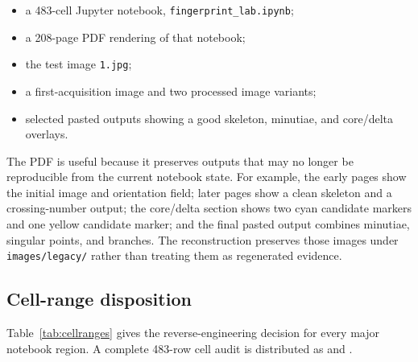 \documentclass[11pt]{article}
\begin{document}
\begin{itemize}
  \item a 483-cell Jupyter notebook, \texttt{fingerprint\_lab.ipynb};
  \item a 208-page PDF rendering of that notebook;
  \item the test image \texttt{1.jpg};
  \item a first-acquisition image and two processed image variants;
  \item selected pasted outputs showing a good skeleton, minutiae, and core/delta overlays.
\end{itemize}

The PDF is useful because it preserves outputs that may no longer be reproducible from the current notebook state. For example, the early pages show the initial image and orientation field; later pages show a clean skeleton and a crossing-number output; the core/delta section shows two cyan candidate markers and one yellow candidate marker; and the final pasted output combines minutiae, singular points, and branches. The reconstruction preserves those images under \texttt{images/legacy/} rather than treating them as regenerated evidence.

\subsection{Cell-range disposition}

Table~\ref{tab:cellranges} gives the reverse-engineering decision for every major notebook region. A complete 483-row cell audit is distributed as  and .
\end{document}
